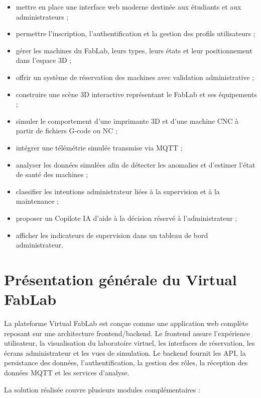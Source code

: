 \begin{itemize}
    \item mettre en place une interface web moderne destinée aux étudiants et aux administrateurs ;
    \item permettre l’inscription, l’authentification et la gestion des profils utilisateurs ;
    \item gérer les machines du FabLab, leurs types, leurs états et leur positionnement dans l’espace 3D ;
    \item offrir un système de réservation des machines avec validation administrative ;
    \item construire une scène 3D interactive représentant le FabLab et ses équipements ;
    \item simuler le comportement d’une imprimante 3D et d’une machine CNC à partir de fichiers G-code ou NC ;
    \item intégrer une télémétrie simulée transmise via MQTT ;
    \item analyser les données simulées afin de détecter les anomalies et d’estimer l’état de santé des machines ;
    \item classifier les intentions administrateur liées à la supervision et à la maintenance ;
    \item proposer un Copilote IA d’aide à la décision réservé à l’administrateur ;
    \item afficher les indicateurs de supervision dans un tableau de bord administrateur.
\end{itemize}

\section{Présentation générale du Virtual FabLab}

La plateforme Virtual FabLab est conçue comme une application web complète reposant sur une architecture frontend/backend. Le frontend assure l’expérience utilisateur, la visualisation du laboratoire virtuel, les interfaces de réservation, les écrans administrateur et les vues de simulation. Le backend fournit les API, la persistance des données, l’authentification, la gestion des rôles, la réception des données MQTT et les services d’analyse.

La solution réalisée couvre plusieurs modules complémentaires :


